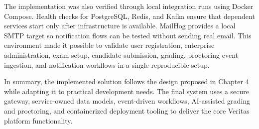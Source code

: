 The implementation was also verified through local integration runs using Docker Compose. Health checks for PostgreSQL, Redis, and Kafka ensure that dependent services start only after infrastructure is available. MailHog provides a local SMTP target so notification flows can be tested without sending real email. This environment made it possible to validate user registration, enterprise administration, exam setup, candidate submission, grading, proctoring event ingestion, and notification workflows in a single reproducible setup.

In summary, the implemented solution follows the design proposed in Chapter 4 while adapting it to practical development needs. The final system uses a secure gateway, service-owned data models, event-driven workflows, AI-assisted grading and proctoring, and containerized deployment tooling to deliver the core Veritas platform functionality.
